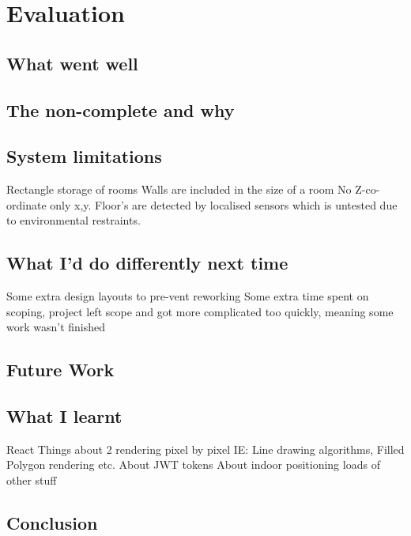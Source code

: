 \section{Evaluation}

\subsection{What went well} %

\subsection{The non-complete and why}

\subsection{System limitations} 
Rectangle storage of rooms
Walls are included in the size of a room
No Z-co-ordinate only x,y. Floor's are detected by localised sensors which is untested due to environmental restraints.

\subsection{What I'd do differently next time}
Some extra design layouts to pre-vent reworking
Some extra time spent on scoping, project left scope and got more complicated too quickly, meaning some work wasn't finished
\subsection{Future Work}

\subsection{What I learnt} %
React
Things about 2 rendering pixel by pixel IE: Line drawing algorithms, Filled Polygon rendering etc.
About JWT tokens
About indoor positioning
loads of other stuff

\subsection{Conclusion}
